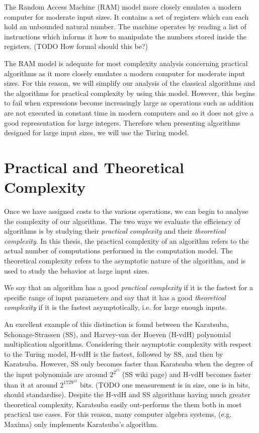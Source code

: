 The Random Access Machine (RAM) model more closely emulates a modern computer for moderate input sizes. It contains a set of registers which can each hold an unbounded natural number. The machine operates by reading a list of instructions which informs it how to manipulate the numbers stored inside the registers. (TODO How formal should this be?)

The RAM model is adequate for most complexity analysis concerning practical algorithms as it more closely emulates a modern computer for moderate input sizes. For this reason, we will simplify our analysis of the classical algorithms and the algorithms for practical complexity by using this model. However, this begins to fail when expressions become increasingly large as operations such as addition are not executed in constant time in modern computers and so it does not give a good representation for large integers. Therefore when presenting algorithms designed for large input sizes, we will use the Turing model.

\section{Practical and Theoretical Complexity}%
\label{sec:Practical and Theoretical Complexity}

Once we have assigned costs to the various operations, we can begin to analyse the complexity of our algorithms. The two ways we evaluate the efficiency of algorithms is by studying their \emph{practical complexity} and their \emph{theoretical complexity}. In this thesis, the practical complexity of an algorithm refers to the actual number of computations performed in the computation model. The theoretical complexity refers to the asymptotic nature of the algorithm, and is used to study the behavior at large input sizes.

We say that an algorithm has a good \textit{practical complexity} if it is the fastest for a specific range of input parameters and say that it has a good \textit{theoretical complexity} if it is the fastest asymptotically, i.e. for large enough inputs.

An excellent example of this distinction is found between the Karatsuba, Schonage-Strassen (SS), and Harvey-van der Hoeven (H-vdH) polynomial multiplication algorithms. Considering their asymptotic complexity with respect to the Turing model, H-vdH is the fastest, followed by SS, and then by Karatsuba. However, SS only becomes faster than Karatsuba when the degree of the input polynomials are around $2^{2^{15}}$ (SS wiki page) and H-vdH becomes faster than it at around $2^{1729^{12}}$ bits. (TODO one measurement is in size, one is in bits, should standardise). Despite the H-vdH and SS algorithms having much greater theoretical complexity, Karatsuba easily out-performs the them both in most practical use cases. For this reason, many computer algebra systems, (e.g. Maxima) only implements Karatsuba's algorithm.

